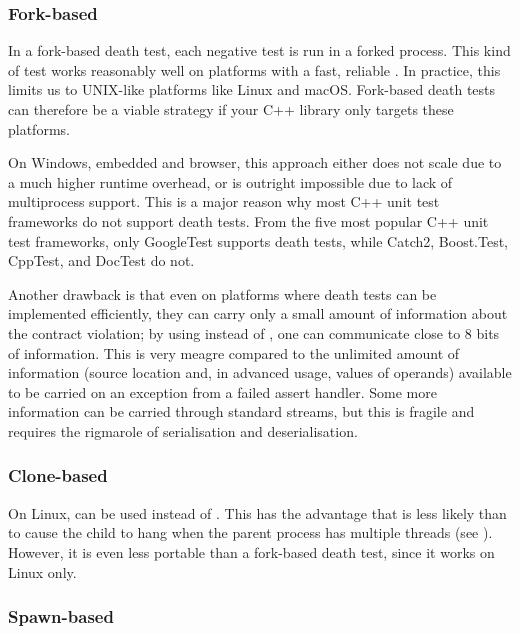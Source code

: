 \subsubsection{Fork-based}

In a fork-based death test, each negative test is run in a forked process. This kind of test works reasonably well on platforms with a fast, reliable . In practice, this limits us to UNIX-like platforms like Linux and macOS. Fork-based death tests can therefore be a viable strategy if your C++ library only targets these platforms.

On Windows, embedded and browser, this approach either does not scale due to a much higher runtime overhead, or is outright impossible due to lack of multiprocess support. This is a major reason why most C++ unit test frameworks do not support death tests. From the five most popular C++ unit test frameworks, only GoogleTest supports death tests, while Catch2, Boost.Test, CppTest, and DocTest do not.

Another drawback is that even on platforms where death tests can be implemented efficiently, they can carry only a small amount of information about the contract violation; by using  instead of , one can communicate close to 8 bits of information. This is very meagre compared to the unlimited amount of information (source location and, in advanced usage, values of operands) available to be carried on an exception from a failed assert handler. Some more information can be carried through standard streams, but this is fragile and requires the rigmarole of serialisation and deserialisation.

\subsubsection{Clone-based}

On Linux,  can be used instead of . This has the advantage that  is less likely than  to cause the child to hang when the parent process has multiple threads (see \cite{GTestDocDeathTests}). However, it is even less portable than a fork-based death test, since it works on Linux only.

\subsubsection{Spawn-based}

